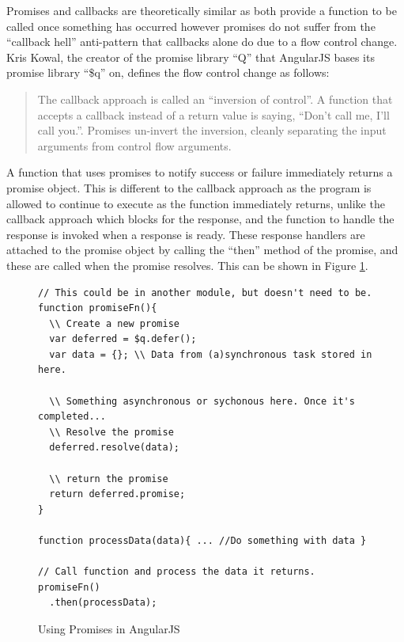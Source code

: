 Promises and callbacks are theoretically similar as both provide a
function to be called once something has occurred however promises do
not suffer from the ``callback hell'' anti-pattern that callbacks
alone do due to a flow control change.
Kris Kowal, the creator of the promise library ``Q'' that
AngularJS bases its promise library ``\$q'' on, defines the flow
control change as follows:
\begin{quote}
The callback approach is called an ``inversion of control''. A function
that accepts a callback instead of a return value is saying, ``Don’t
call me, I’ll call you.''. Promises un-invert the inversion, cleanly
separating the input arguments from control flow arguments.\cite{kriskowalq}
\end{quote}

A function that uses promises to notify success or failure immediately
returns a promise object. This is different to the callback approach
as the program is allowed to continue to execute as the function
immediately returns, unlike the callback approach which blocks for the
response, and the function to handle the response is invoked when a
response is ready. These response handlers are attached to the promise
object by calling the ``then'' method of the promise, and these are
called when the promise resolves. This can be shown in Figure
\ref{fig:promises}. 

\begin{figure}[h]
\begin{verbatim}
// This could be in another module, but doesn't need to be.
function promiseFn(){
  \\ Create a new promise
  var deferred = $q.defer();
  var data = {}; \\ Data from (a)synchronous task stored in here.  

  \\ Something asynchronous or sychonous here. Once it's completed...
  \\ Resolve the promise
  deferred.resolve(data);

  \\ return the promise
  return deferred.promise;
}

function processData(data){ ... //Do something with data }

// Call function and process the data it returns.
promiseFn()
  .then(processData);
\end{verbatim}
\caption{Using Promises in AngularJS}
\label{fig:promises}
\end{figure}

